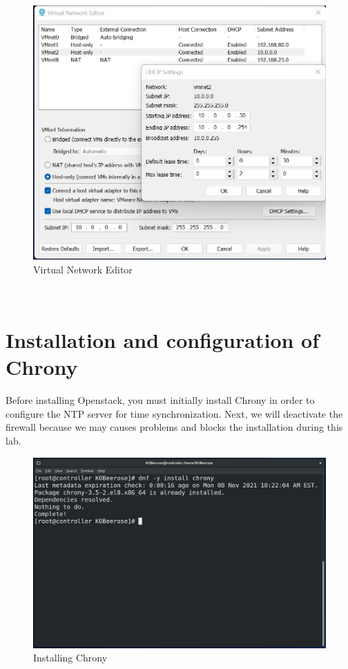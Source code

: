 \begin{spacing}{1.2}
\begin{figure}[!htb]
\begin{center}
\includegraphics[width=1\linewidth]{Cloud/Config/Virtual Network Editor} 
\end{center} 
\caption{Virtual Network Editor} 
\end{figure}  \FloatBarrier
\\
\section{Installation and configuration of Chrony}

\par Before installing Openstack, you must initially install Chrony in order to configure the NTP server for time synchronization. Next, we will deactivate the firewall because we may causes problems and blocks the installation during this lab.
\\

\begin{figure}[!htb] 
\begin{center} 
\includegraphics[width=1\linewidth]{Cloud/Config/Installing Chrony} 
\end{center} 
\caption{Installing Chrony} 
\end{figure} \FloatBarrier


\end{spacing}
